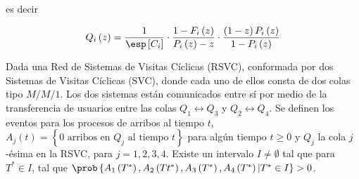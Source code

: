 es decir

\begin{equation}
Q_{i}\left(z\right)=\frac{1}{\esp\left[C_{i}\right]}\cdot\frac{1-F_{i}\left(z\right)}{P_{i}\left(z\right)-z}\cdot\frac{\left(1-z\right)P_{i}\left(z\right)}{1-P_{i}\left(z\right)}
\end{equation}

\begin{Teo}
Dada una Red de Sistemas de Visitas C\'iclicas (RSVC), conformada por dos Sistemas de Visitas C\'iclicas (SVC), donde cada uno de ellos consta de dos colas tipo $M/M/1$. Los dos sistemas est\'an comunicados entre s\'i por medio de la transferencia de usuarios entre las colas $Q_{1}\leftrightarrow Q_{3}$ y $Q_{2}\leftrightarrow Q_{4}$. Se definen los eventos para los procesos de arribos al tiempo $t$, $A_{j}\left(t\right)=\left\{0 \textrm{ arribos en }Q_{j}\textrm{ al tiempo }t\right\}$ para alg\'un tiempo $t\geq0$ y $Q_{j}$ la cola $j$-\'esima en la RSVC, para $j=1,2,3,4$.  Existe un intervalo $I\neq\emptyset$ tal que para $T^{*}\in I$, tal que $\prob\left\{A_{1}\left(T^{*}\right),A_{2}\left(Tt^{*}\right),
A_{3}\left(T^{*}\right),A_{4}\left(T^{*}\right)|T^{*}\in I\right\}>0$.
\end{Teo}

